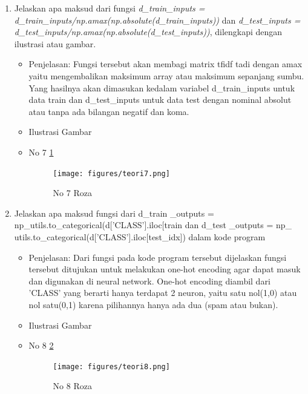 \begin{enumerate}
\item Jelaskan apa maksud dari fungsi \emph{d\_train\_inputs = d\_train\_inputs/np.amax(np.absolute(d\_train\_inputs))} dan \emph{d\_test\_inputs = d\_test\_inputs/np.amax(np.absolute(d\_test\_inputs))}, dilengkapi dengan ilustrasi atau gambar.
\begin{itemize}
\item Penjelasan: Fungsi tersebut akan membagi matrix tfidf tadi dengan amax yaitu mengembalikan maksimum array atau maksimum sepanjang sumbu. Yang hasilnya akan dimasukan kedalam variabel d\_train\_inputs untuk data train dan d\_test\_inputs untuk data test dengan nominal absolut atau tanpa ada bilangan negatif dan koma.
\par 
\par
\item Ilustrasi Gambar
\item No 7 \ref{teori7}
\begin{figure}[!hbtp]
\centering
\texttt{[image: figures/teori7.png]}
\caption{No 7 Roza}
\label{teori7}
\end{figure}
\par
\end{itemize}
\par
\par

\item Jelaskan apa maksud fungsi dari d\_train \_outputs = np\_utils.to\_categorical(d['CLASS'].iloc[train dan d\_test \_outputs = np\_ utils.to\_categorical(d['CLASS'].iloc[test\_idx]) dalam kode program
\begin{itemize}
\item Penjelasan: Dari fungsi pada kode program tersebut dijelaskan fungsi tersebut ditujukan untuk melakukan one-hot encoding agar dapat masuk dan digunakan di neural network. One-hot encoding diambil dari 'CLASS' yang berarti hanya terdapat 2 neuron, yaitu satu nol(1,0) atau nol satu(0,1) karena pilihannya hanya ada dua (spam atau bukan).
\par 
\par
\item Ilustrasi Gambar
\item No 8 \ref{teori8}
\begin{figure}[!hbtp]
\centering
\texttt{[image: figures/teori8.png]}
\caption{No 8 Roza}
\label{teori8}
\end{figure}
\par
\end{itemize}
\par
\par


\end{enumerate}
